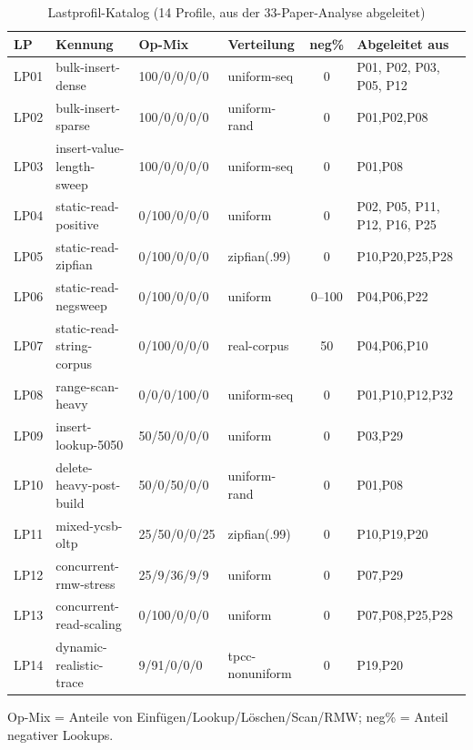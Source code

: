 \begin{table}[!htbp]
  \caption{Lastprofil-Katalog (14 Profile, aus der 33-Paper-Analyse abgeleitet)}\label{tab:lp-catalog}
  \centering\footnotesize
  \begin{tabular}{@{}l p{3.3cm} l l c p{2.4cm}@{}}
    \toprule
    \textbf{LP} & \textbf{Kennung} & \textbf{Op-Mix} & \textbf{Verteilung} & \textbf{neg\%} & \textbf{Abgeleitet aus} \\
    \midrule
    LP01 & bulk-insert-dense & 100/0/0/0/0 & uniform-seq & 0 & P01, P02, P03, P05, P12 \\
    LP02 & bulk-insert-sparse & 100/0/0/0/0 & uniform-rand & 0 & P01,P02,P08 \\
    LP03 & insert-value-length-sweep & 100/0/0/0/0 & uniform-seq & 0 & P01,P08 \\
    LP04 & static-read-positive & 0/100/0/0/0 & uniform & 0 & P02, P05, P11, P12, P16, P25 \\
    LP05 & static-read-zipfian & 0/100/0/0/0 & zipfian(.99) & 0 & P10,P20,P25,P28 \\
    LP06 & static-read-negsweep & 0/100/0/0/0 & uniform & 0--100 & P04,P06,P22 \\
    LP07 & static-read-string-corpus & 0/100/0/0/0 & real-corpus & 50 & P04,P06,P10 \\
    LP08 & range-scan-heavy & 0/0/0/100/0 & uniform-seq & 0 & P01,P10,P12,P32 \\
    LP09 & insert-lookup-5050 & 50/50/0/0/0 & uniform & 0 & P03,P29 \\
    LP10 & delete-heavy-post-build & 50/0/50/0/0 & uniform-rand & 0 & P01,P08 \\
    LP11 & mixed-ycsb-oltp & 25/50/0/0/25 & zipfian(.99) & 0 & P10,P19,P20 \\
    LP12 & concurrent-rmw-stress & 25/9/36/9/9 & uniform & 0 & P07,P29 \\
    LP13 & concurrent-read-scaling & 0/100/0/0/0 & uniform & 0 & P07,P08,P25,P28 \\
    LP14 & dynamic-realistic-trace & 9/91/0/0/0 & tpcc-nonuniform & 0 & P19,P20 \\
    \bottomrule
  \end{tabular}

  \smallskip
  {\footnotesize Op-Mix = Anteile von Einfügen/Lookup/Löschen/Scan/RMW\@; neg\% = Anteil negativer Lookups.\par}
\end{table}

